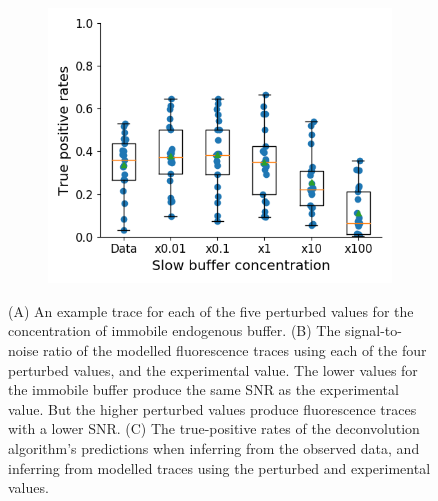 \begin{figure}[p]
\begin{subfigure}{0.45\textwidth}
        \includegraphics[width=\linewidth]{figures/calcium_chapter/immobile_perturbed_oasis_first_paper.png}
        \caption{}
    \end{subfigure}
    \caption{(A) An example trace for each of the five perturbed values for the concentration of immobile endogenous buffer.	(B) The signal-to-noise ratio of the modelled fluorescence traces using each of the four perturbed values, and the experimental value. The lower values for the immobile buffer produce the same SNR as the experimental value. But the higher perturbed values produce fluorescence traces with a lower SNR.	(C) The true-positive rates of the deconvolution algorithm's predictions when inferring from the observed data, and inferring from modelled traces using the perturbed and experimental values.}
    \label{fig:endogenous_perturbed}
\end{figure}

